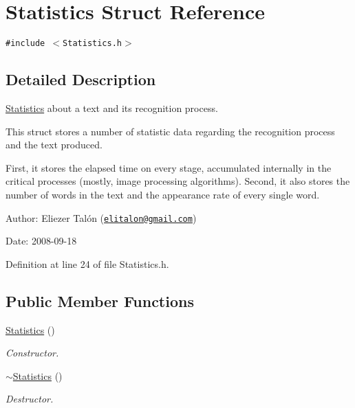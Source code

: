 \hypertarget{struct_statistics}{
\section{Statistics Struct Reference}
\label{struct_statistics}
}
{\tt \#include $<$Statistics.h$>$}



\subsection{Detailed Description}
\hyperlink{struct_statistics}{Statistics} about a text and its recognition process. 

This struct stores a number of statistic data regarding the recognition process and the text produced.

First, it stores the elapsed time on every stage, accumulated internally in the critical processes (mostly, image processing algorithms). Second, it also stores the number of words in the text and the appearance rate of every single word.

\begin{Desc}
\item[Author:]Eliezer Talón (\href{mailto:elitalon@gmail.com}{\tt elitalon@gmail.com}) \end{Desc}
\begin{Desc}
\item[Date:]2008-09-18 \end{Desc}


Definition at line 24 of file Statistics.h.\subsection*{Public Member Functions}
\begin{CompactItemize}
\item 
\hyperlink{struct_statistics_60ddd90a571ed4c3ce8c0f6317a36d63}{Statistics} ()
\begin{CompactList}\small\item\em Constructor. \item\end{CompactList}\item 
\hyperlink{struct_statistics_b68ede75479e44d5c35b78ec1284065b}{$\sim$Statistics} ()
\begin{CompactList}\small\item\em Destructor. \item\end{CompactList}\end{CompactItemize}

